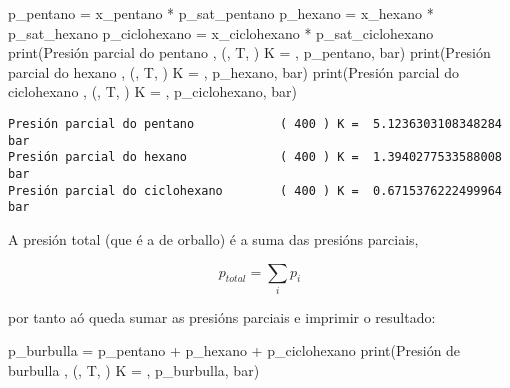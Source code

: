 \documentclass[
  letterpaper,
  DIV=11,
  numbers=noendperiod]{scrartcl}
\newenvironment{Shaded}{\begin{snugshade}}{\end{snugshade}}
\newcommand{\BuiltInTok}[1]{\textcolor[rgb]{0.00,0.23,0.31}{#1}}
\newcommand{\NormalTok}[1]{\textcolor[rgb]{0.00,0.23,0.31}{#1}}
\newcommand{\OperatorTok}[1]{\textcolor[rgb]{0.37,0.37,0.37}{#1}}
\newcommand{\StringTok}[1]{\textcolor[rgb]{0.13,0.47,0.30}{#1}}
\begin{document}
\begin{Shaded}
\begin{Highlighting}[]
\NormalTok{p\_pentano     }\OperatorTok{=}\NormalTok{ x\_pentano     }\OperatorTok{*}\NormalTok{ p\_sat\_pentano}
\NormalTok{p\_hexano      }\OperatorTok{=}\NormalTok{ x\_hexano      }\OperatorTok{*}\NormalTok{ p\_sat\_hexano}
\NormalTok{p\_ciclohexano }\OperatorTok{=}\NormalTok{ x\_ciclohexano }\OperatorTok{*}\NormalTok{ p\_sat\_ciclohexano}
\BuiltInTok{print}\NormalTok{(}\StringTok{\textquotesingle{}Presión parcial do pentano           \textquotesingle{}}\NormalTok{, }\StringTok{\textquotesingle{}(\textquotesingle{}}\NormalTok{, T, }\StringTok{\textquotesingle{}) K = \textquotesingle{}}\NormalTok{, p\_pentano, }\StringTok{\textquotesingle{}bar\textquotesingle{}}\NormalTok{)}
\BuiltInTok{print}\NormalTok{(}\StringTok{\textquotesingle{}Presión parcial do hexano            \textquotesingle{}}\NormalTok{, }\StringTok{\textquotesingle{}(\textquotesingle{}}\NormalTok{, T, }\StringTok{\textquotesingle{}) K = \textquotesingle{}}\NormalTok{, p\_hexano, }\StringTok{\textquotesingle{}bar\textquotesingle{}}\NormalTok{)}
\BuiltInTok{print}\NormalTok{(}\StringTok{\textquotesingle{}Presión parcial do ciclohexano       \textquotesingle{}}\NormalTok{, }\StringTok{\textquotesingle{}(\textquotesingle{}}\NormalTok{, T, }\StringTok{\textquotesingle{}) K = \textquotesingle{}}\NormalTok{, p\_ciclohexano, }\StringTok{\textquotesingle{}bar\textquotesingle{}}\NormalTok{)}
\end{Highlighting}
\end{Shaded}

\begin{verbatim}
Presión parcial do pentano            ( 400 ) K =  5.1236303108348284 bar
Presión parcial do hexano             ( 400 ) K =  1.3940277533588008 bar
Presión parcial do ciclohexano        ( 400 ) K =  0.6715376222499964 bar
\end{verbatim}

A presión total (que é a de orballo) é a suma das presións parciais,

\[
p_{total} = \sum_i p_i
\]

por tanto aó queda sumar as presións parciais e imprimir o resultado:

\begin{Shaded}
\begin{Highlighting}[]
\NormalTok{p\_burbulla    }\OperatorTok{=}\NormalTok{ p\_pentano }\OperatorTok{+}\NormalTok{ p\_hexano }\OperatorTok{+}\NormalTok{ p\_ciclohexano}
\BuiltInTok{print}\NormalTok{(}\StringTok{\textquotesingle{}Presión de burbulla                  \textquotesingle{}}\NormalTok{, }\StringTok{\textquotesingle{}(\textquotesingle{}}\NormalTok{, T, }\StringTok{\textquotesingle{}) K = \textquotesingle{}}\NormalTok{, p\_burbulla, }\StringTok{\textquotesingle{}bar\textquotesingle{}}\NormalTok{)}
\end{Highlighting}
\end{Shaded}
\end{document}
